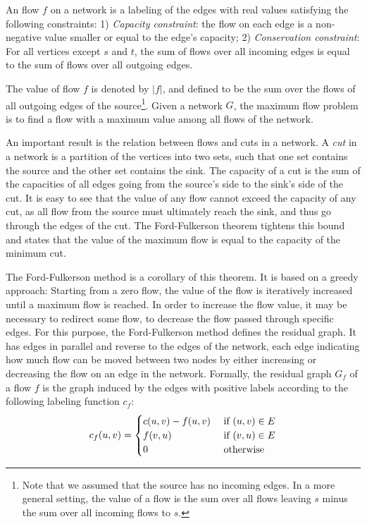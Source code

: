\documentclass{llncs}
\begin{document}
An flow $f$ on a network is a labeling of the edges with real values satisfying the following constraints: 1) \emph{Capacity constraint}: the flow on each edge is a non-negative value smaller or equal to the edge's capacity; 2) \emph{Conservation constraint}: For all vertices except $s$ and $t$, the sum of flows over all incoming edges is equal to the sum of flows over all outgoing edges. 

The value of flow $f$ is denoted by $|f|$, and defined to be the sum over the flows of all outgoing edges of the source\footnote{Note that we assumed that the source has no incoming edges. In a more general setting, the value of a flow is the sum over all flows leaving $s$ minus the sum over all incoming flows to $s$.}.
Given a network $G$, the maximum flow problem is to find a flow with a maximum value among all flows of the network. 

An important result is the relation between flows and cuts in a network. A \emph{cut} in a network is a partition of the vertices into two sets, such that one set contains 
the source and the other set contains the sink. The capacity of a cut is the sum of the capacities of all edges going from the source's side to the sink's side of the cut.
It is easy to see that the value of any flow cannot exceed the capacity of any cut, as all flow from the source must ultimately reach the sink, and thus go through the edges of the cut. The Ford-Fulkerson theorem tightens this bound and states that the value of the maximum flow is equal to the capacity of the minimum cut.

The Ford-Fulkerson method is a corollary of this theorem. It is based on a greedy approach: Starting from a zero flow, the value of the flow is iteratively increased until a maximum flow is reached. In order to increase the flow value, it may be necessary to redirect some flow, \ie to decrease the flow passed through specific edges. For this purpose, the Ford-Fulkerson method defines the residual graph. It has edges in parallel and reverse to the edges of the network, each edge indicating how much flow can be moved between two nodes by either increasing or decreasing the flow on an edge in the network. Formally, the residual graph $G_f$ of a flow $f$ is the graph induced by the 
edges with positive labels according to the following labeling function $c_f$:
\[ c_f (u, v) = 
  \begin{cases}
  c (u, v) - f(u, v) \hfill & \text{ if $(u, v) \in E$} \\
  f (v, u) \hfill & \text{ if $(v, u) \in E$} \\  
  0 \hfill & \text{ otherwise} \\
  \end{cases} 
\]
\end{document}
